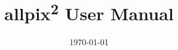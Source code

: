 \documentclass{scrartcl}
\title{allpix\textsuperscript{2} User Manual} %
\author{
} %
\date{\today} %
\begin{document}
\maketitle %


\begin{abstract}
\end{abstract}

\newpage
\tableofcontents

\newpage
\clearpage
{}
{}
\begin{thebibliography}{99}
  
\end{thebibliography}  
\end{document}
